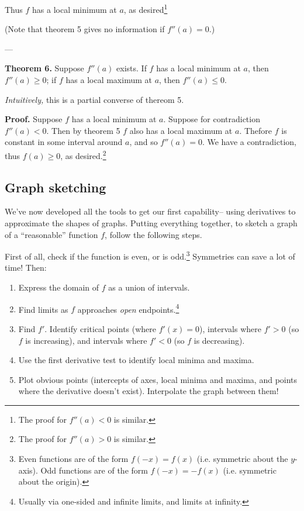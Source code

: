 Thus $f$ has a local minimum at $a$, as desired\footnote{The proof for
  $f''(a)<0$ is similar.}

\vs

(Note that theorem 5 gives no information if $f''(a)=0$.)

\vs---\vs

\textbf{Theorem 6.} Suppose $f''(a)$ exists. If $f$ has a local
minimum at $a$, then $f''(a)\geq0$; if $f$ has a local maximum at $a$,
then $f''(a)\leq 0$.

\vs

\textit{Intuitively,} this is a partial converse of thereom 5.

\vs

\textbf{Proof.} Suppose $f$ has a local minimum at $a$. Suppose for
contradiction $f''(a)<0$. Then by theorem 5 $f$ also has a local
maximum at $a$. Thefore $f$ is constant in some interval around $a$,
and so $f''(a)=0$. We have a contradiction, thus $f(a)\geq 0$, as
desired.\footnote{The proof for $f''(a)>0$ is similar.}


\subsection{Graph sketching}
We've now developed all the tools to get our first capability-- using
derivatives to approximate the shapes of graphs. Putting everything
together, to sketch a graph of a ``reasonable'' function $f$, follow
the following steps.

\vs

First of all, check if the function is even, or is odd.\footnote{Even
  functions are of the form $f(-x)=f(x)$ (i.e. symmetric about the
  $y$-axis). Odd functions are of the form $f(-x)=-f(x)$ (i.e.
  symmetric about the origin).} Symmetries can save a lot of time!
Then:

\begin{enumerate}
\item Express the domain of $f$ as a union of intervals.
\item Find limits as $f$ approaches \textit{open}
  endpoints.\footnote{Usually via one-sided and infinite limits, and
    limits at infinity.}
\item Find $f'$. Identify critical points (where $f'(x)=0$),
intervals where $f'>0$ (so $f$ is increasing), and intervals where
$f'<0$ (so $f$ is decreasing).
\item Use the first derivative test to identify local minima and
  maxima.
\item Plot obvious points (intercepts of axes, local minima and
  maxima, and points where the derivative doesn't exist). Interpolate
  the graph between them!
\end{enumerate}

